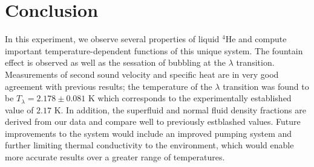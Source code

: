 
\section{Conclusion}\label{conclusion}

In this experiment, we observe several properties of liquid $^4$He and
compute important temperature-dependent functions of this unique
system. The fountain effect is observed as well as the sessation of
bubbling at the $\lambda$ transition. Measurements of second sound
velocity and specific heat are in very good agreement with previous
results; the temperature of the $\lambda$ transition was found to be
$T_{\lambda} = 2.178 \pm 0.081$ K which corresponds to the
experimentally established value of $2.17$ K. In addition, the
superfluid and normal fluid density fractions are derived from our
data and compare well to previously estblashed values. Future
improvements to the system would include an improved pumping system
and further limiting thermal conductivity to the environment, which
would enable more accurate results over a greater range of
temperatures.


